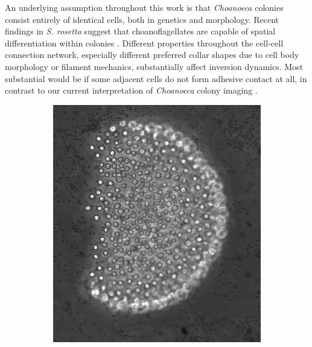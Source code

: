 An underlying assumption throughout this work is that \textit{Choanoeca} colonies consist entirely of identical cells, both in genetics and morphology.
Recent findings in \textit{S. rosetta} suggest that choanoflagellates are capable of spatial differentiation within colonies \citep{laundon2019,naumann2019}.
Different properties throughout the cell-cell connection network, especially different preferred collar shapes due to cell body morphology or filament mechanics, substantially affect inversion dynamics.
Most substantial would be if some adjacent cells do not form adhesive contact at all, in contrast to our current interpretation of \textit{Choanoeca} colony imaging \citep{brunet2019}.

\begin{figure}
	\centering
	\begin{subfigure}[b]{0.46\textwidth}
		\centering
		\includegraphics[height=\textwidth,angle=90]{edges1.png}
		\caption{}
		\label{subfig:edges1}
	\end{subfigure}
	\begin{subfigure}[b]{0.49\textwidth}
		\centering

\end{subfigure}
\end{figure}
